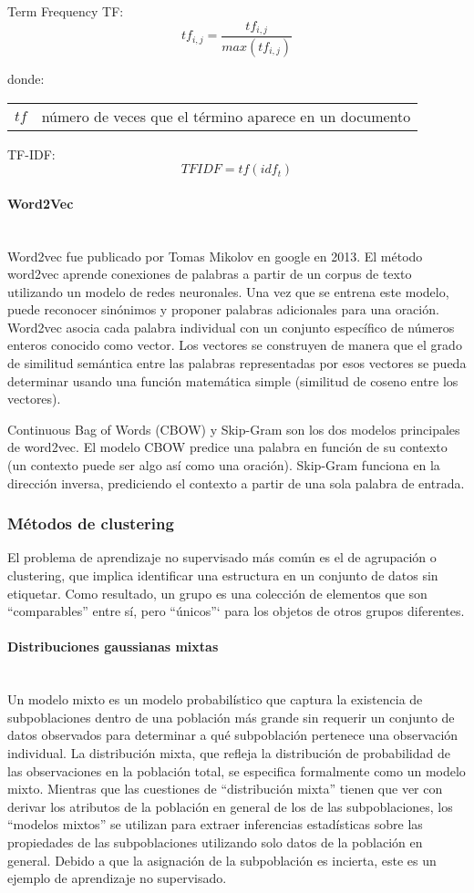 \documentclass[12pt]{article}
\makeatletter
\newcommand{\subsubsubsection}[1]{\paragraph{#1}\mbox{}\\}
\newenvironment{conditions}
{\par\vspace{\abovedisplayskip}\noindent\begin{tabular}{>{$}l<{$} @{${}={}$} l}}
	{\end{tabular}\par\vspace{\belowdisplayskip}}
\makeatother
\begin{document}
				Term Frequency TF:
				\begin{equation}\label{eq:term_frequency}
				tf_{i,j}=\frac{tf_{i,j}}{max(tf_{i,j})}
				\end{equation}
				
				donde:
				\begin{conditions}
					tf &  número de veces que el término aparece en un documento 
				\end{conditions}			
			TF-IDF:
				\begin{equation}\label{eq:TFIDF}
				TFIDF=tf (idf_t)
				\end{equation}
				
				\subsubsubsection{Word2Vec}
				Word2vec fue publicado por Tomas Mikolov en google en 2013. El método word2vec aprende conexiones de palabras a partir de un corpus de texto utilizando un modelo de redes neuronales. Una vez que se entrena este modelo, puede reconocer sinónimos y proponer palabras adicionales para una oración. Word2vec asocia cada palabra individual con un conjunto específico de números enteros conocido como vector. Los vectores se construyen de manera que el grado de similitud semántica entre las palabras representadas por esos vectores se pueda determinar usando una función matemática simple (similitud de coseno entre los vectores). \cite{Jain2020}
				
				Continuous Bag of Words (CBOW) y Skip-Gram son los dos modelos principales de word2vec. El modelo CBOW predice una palabra en función de su contexto (un contexto puede ser algo así como una oración). Skip-Gram funciona en la dirección inversa, prediciendo el contexto a partir de una sola palabra de entrada.\cite{Meyer2016}
				
			\subsubsection{Métodos de clustering}
			El problema de aprendizaje no supervisado más común es el de agrupación o clustering, que implica identificar una estructura en un conjunto de datos sin etiquetar. Como resultado, un grupo es una colección de elementos que son ``comparables'' entre sí, pero ``únicos''` para los objetos de otros grupos diferentes.\cite{Madhulatha2012}
							
				\subsubsubsection{Distribuciones gaussianas mixtas}
				Un modelo mixto es un modelo probabilístico que captura la existencia de subpoblaciones dentro de una población más grande sin requerir un conjunto de datos observados para determinar a qué subpoblación pertenece una observación individual. La distribución mixta, que refleja la distribución de probabilidad de las observaciones en la población total, se especifica formalmente como un modelo mixto. Mientras que las cuestiones de ``distribución mixta'' tienen que ver con derivar los atributos de la población en general de los de las subpoblaciones, los ``modelos mixtos'' se utilizan para extraer inferencias estadísticas sobre las propiedades de las subpoblaciones utilizando solo datos de la población en general. Debido a que la asignación de la subpoblación es incierta, este es un ejemplo de aprendizaje no supervisado. \cite{Elmahdy2013}
								
\end{document}
